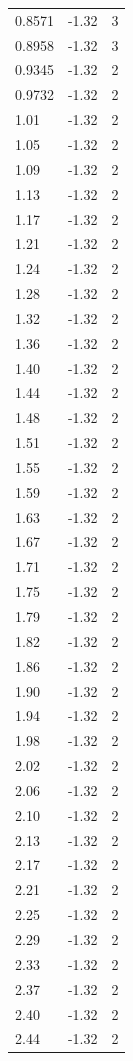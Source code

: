 \begin{longtable}{lrr}
  0.8571 & -1.32 & 3 \\
  0.8958 & -1.32 & 3 \\
  0.9345 & -1.32 & 2 \\
  0.9732 & -1.32 & 2 \\
  1.01 & -1.32 & 2 \\
  1.05 & -1.32 & 2 \\
  1.09 & -1.32 & 2 \\
  1.13 & -1.32 & 2 \\
  1.17 & -1.32 & 2 \\
  1.21 & -1.32 & 2 \\
  1.24 & -1.32 & 2 \\
  1.28 & -1.32 & 2 \\
  1.32 & -1.32 & 2 \\
  1.36 & -1.32 & 2 \\
  1.40 & -1.32 & 2 \\
  1.44 & -1.32 & 2 \\
  1.48 & -1.32 & 2 \\
  1.51 & -1.32 & 2 \\
  1.55 & -1.32 & 2 \\
  1.59 & -1.32 & 2 \\
  1.63 & -1.32 & 2 \\
  1.67 & -1.32 & 2 \\
  1.71 & -1.32 & 2 \\
  1.75 & -1.32 & 2 \\
  1.79 & -1.32 & 2 \\
  1.82 & -1.32 & 2 \\
  1.86 & -1.32 & 2 \\
  1.90 & -1.32 & 2 \\
  1.94 & -1.32 & 2 \\
  1.98 & -1.32 & 2 \\
  2.02 & -1.32 & 2 \\
  2.06 & -1.32 & 2 \\
  2.10 & -1.32 & 2 \\
  2.13 & -1.32 & 2 \\
  2.17 & -1.32 & 2 \\
  2.21 & -1.32 & 2 \\
  2.25 & -1.32 & 2 \\
  2.29 & -1.32 & 2 \\
  2.33 & -1.32 & 2 \\
  2.37 & -1.32 & 2 \\
  2.40 & -1.32 & 2 \\
  2.44 & -1.32 & 2 \\

\end{longtable}
